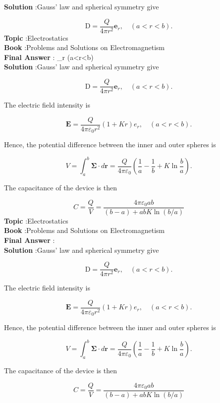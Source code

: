 \documentclass[10pt]{article}
\begin{document}
\textbf{Solution} :Gauss' law and spherical symmetry give

$$
\mathrm{D}=\frac{Q}{4 \pi r^{2}} \mathbf{e}_{r}, \quad(a<r<b) .
$$
\textbf{Topic} :Electrostatics\\
\textbf{Book} :Problems and Solutions on Electromagnetism\\
\textbf{Final Answer} : _{r} \quad(a<r<b)\\


\textbf{Solution} :Gauss' law and spherical symmetry give

$$
\mathrm{D}=\frac{Q}{4 \pi r^{2}} \mathbf{e}_{r}, \quad(a<r<b) .
$$

 The electric field intensity is

$$
\mathbf{E}=\frac{Q}{4 \pi \varepsilon_{0} r^{2}}(1+K r) e_{r}, \quad(a<r<b) .
$$

Hence, the potential difference between the inner and outer spheres is

$$
V=\int_{a}^{b} \mathbf{\Sigma} \cdot d \mathbf{r}=\frac{Q}{4 \pi \varepsilon_{0}}\left(\frac{1}{a}-\frac{1}{b}+K \ln \frac{b}{a}\right) .
$$

The capacitance of the device is then

$$
C=\frac{Q}{V}=\frac{4 \pi \varepsilon_{0} a b}{(b-a)+a b K \ln (b / a)}
$$
\textbf{Topic} :Electrostatics\\
\textbf{Book} :Problems and Solutions on Electromagnetism\\
\textbf{Final Answer} :\\


\textbf{Solution} :Gauss' law and spherical symmetry give

$$
\mathrm{D}=\frac{Q}{4 \pi r^{2}} \mathbf{e}_{r}, \quad(a<r<b) .
$$

 The electric field intensity is

$$
\mathbf{E}=\frac{Q}{4 \pi \varepsilon_{0} r^{2}}(1+K r) e_{r}, \quad(a<r<b) .
$$

Hence, the potential difference between the inner and outer spheres is

$$
V=\int_{a}^{b} \mathbf{\Sigma} \cdot d \mathbf{r}=\frac{Q}{4 \pi \varepsilon_{0}}\left(\frac{1}{a}-\frac{1}{b}+K \ln \frac{b}{a}\right) .
$$

The capacitance of the device is then

$$
C=\frac{Q}{V}=\frac{4 \pi \varepsilon_{0} a b}{(b-a)+a b K \ln (b / a)}
$$
\end{document}
